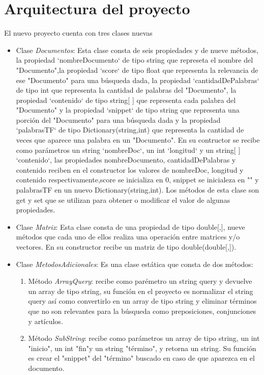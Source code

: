 \documentclass{article}
\begin{document}
\section{Arquitectura del proyecto}
El nuevo proyecto cuenta con tres clases nuevas
\begin{itemize}
    \item Clase \textit{Documentos}: Esta clase consta de seis propiedades y de nueve métodos, la propiedad
     `nombreDocumento` de tipo string que represeta el nombre del "Documento",la propiedad `score` de tipo 
     float que representa la relevancia de ese "Documento" para una búsqueda dada, la propiedad 
     `cantidadDePalabras` de tipo int que representa la cantidad de palabras del "Documento", 
     la propiedad `contenido` de tipo string[ ] que representa cada palabra del "Documento" y 
     la propiedad `snippet` de tipo string que representa una porción del "Documento" para una 
     búsqueda dada y la propiedad `palabrasTF` de tipo Dictionary(string,int) que representa la 
     cantidad de veces que aparece una palabra en un "Documento". En su contructor se recibe como
     parámetros un string `nombreDoc`, un int `longitud` y un string[ ] `contenido`, las propiedades
     nombreDocumento, cantidadDePalabras y contenido reciben en el constructor los valores de nombreDoc,
     longitud y contenido respectivamente,score se inicializa en 0, snippet se inicialeza en "" 
     y palabrasTF en un nuevo Dictionary(string,int). Los métodos de esta clase son get y set que se utilizan
     para obtener o modificar el valor de algunas propiedades.
    \item Clase \textit{Matriz}: Esta clase consta de una propiedad de tipo double[,], nueve métodos que cada uno 
    de ellos realiza una operación entre matrices y/o vectores. En su constructor recibe un matriz de tipo
    double(double[,]).
    \item Clase \textit{MetodosAdicionales}: Es una clase estática que consta de dos métodos:
    \begin{enumerate}
        \item Método \textit{ArrayQuery}: recibe como parémetro un string query y devuelve un array de tipo 
        string, su función en el proyecto es normalizar el string query así como convertirlo en un array de 
        tipo string y eliminar términos que no son relevantes para la búsqueda como preposiciones, conjunciones
         y artículos.
        \item Método \textit{SubString}: recibe como parámetros un array de tipo string, un int "inicio", 
        un int "fin"y un string "término", y retorna un string. Su función es crear el "snippet" del 
        "término" buscado en caso de que aparezca en el documento.
    \end{enumerate}
\end{itemize}
\end{document}
